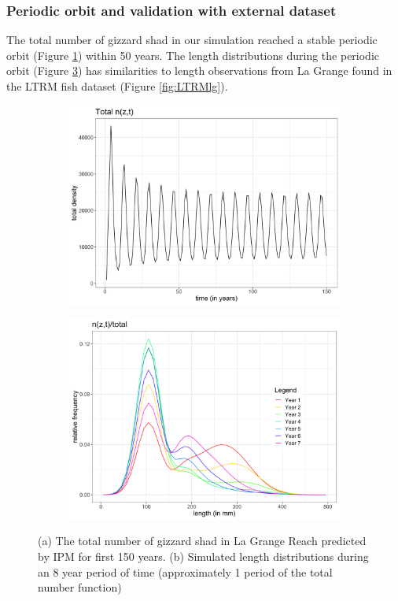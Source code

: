 \documentclass[preprint,review,12pt,authoryear]{elsarticle}
\begin{document}
\subsubsection{Periodic orbit and validation with external dataset}
The total number of gizzard shad in our simulation reached a stable periodic orbit (Figure \ref{fig:ntotal}) within 50 years. 
The length distributions during the periodic orbit (Figure \ref{fig:period}) has similarities to length observations from La Grange found in the LTRM fish dataset (Figure \ref{fig:LTRMlg}). 
\begin{figure}
\centering
\begin{subfigure}[b]{.43\textwidth}
  \includegraphics[width=\textwidth]{figures/ntotal.png}
   \caption{}
  \label{fig:ntotal}
\end{subfigure}
\begin{subfigure}[b]{.43\textwidth}
   \includegraphics[width=\textwidth]{figures/period.png}
     \caption{}
\label{fig:period}
\end{subfigure}
\caption{(a) The total number of gizzard shad in La Grange Reach predicted by IPM for first 150 years. (b) Simulated length distributions during an 8 year period of time (approximately 1 period of the total number function) }
\end{figure}    
\end{document}
